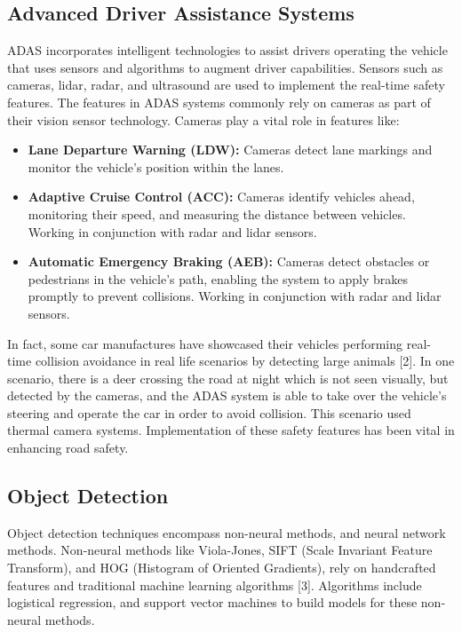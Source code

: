 \documentclass[conference]{IEEEtran}
\begin{document}
\subsection{Advanced Driver Assistance Systems}
ADAS incorporates intelligent technologies to assist drivers operating the vehicle that uses sensors and algorithms to augment driver 
capabilities. Sensors such as cameras, lidar, radar, and ultrasound are used to implement the real-time safety features. 
The features in ADAS systems commonly rely on cameras as part of their vision sensor technology. Cameras play a vital 
role in features like:
\begin{itemize}
    \item \textbf{Lane Departure Warning (LDW):}
    Cameras detect lane markings and monitor the vehicle's position within the lanes.
    \item \textbf{Adaptive Cruise Control (ACC):}
    Cameras identify vehicles ahead, monitoring their speed, and measuring the distance between vehicles. Working 
    in conjunction with radar and lidar sensors.
    \item \textbf{Automatic Emergency Braking (AEB):}
    Cameras detect obstacles or pedestrians in the vehicle's path, enabling the system to apply brakes promptly to prevent collisions. Working 
    in conjunction with radar and lidar sensors.
\end{itemize}

In fact, some car manufactures have showcased their vehicles performing real-time collision avoidance in real life 
scenarios by detecting large animals [2]. In one scenario, there is a deer crossing the road at night which is not seen visually, but detected by the cameras, 
and the ADAS system is able to take over the vehicle's steering and operate the car in order to avoid collision. This scenario used thermal camera
systems. Implementation of these safety features has been vital in enhancing road safety.

\subsection{Object Detection}
Object detection techniques encompass non-neural methods, and neural network methods.
Non-neural methods like Viola-Jones, SIFT (Scale Invariant Feature Transform), and HOG (Histogram of Oriented Gradients), rely on handcrafted features 
and traditional machine learning algorithms [3]. Algorithms include logistical regression, and support
vector machines to build models for these non-neural methods.
\end{document}
